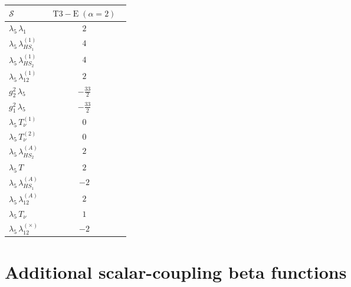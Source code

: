 \documentclass[9pt]{article}
\begin{document}
\begin{longtable}{@{}p{0.31\linewidth}c@{}}
\toprule
$\mathcal{S}$ & $ \mathrm{T3-E}\;(\alpha=2) $ \\
\midrule
$ \lambda_5\,\lambda_1 $ & $ 2 $ \\
$ \lambda_5\,\lambda_{HS_1}^{(1)} $ & $ 4 $ \\
$ \lambda_5\,\lambda_{HS_2}^{(1)} $ & $ 4 $ \\
$ \lambda_5\,\lambda_{12}^{(1)} $ & $ 2 $ \\
$ g_2^2\,\lambda_5 $ & $ - \frac{33}{2} $ \\
$ g_1^2\,\lambda_5 $ & $ - \frac{33}{2} $ \\
$ \lambda_5\,T_{\nu}^{(1)} $ & $0$ \\
$ \lambda_5\,T_{\nu}^{(2)} $ & $0$ \\
$ \lambda_5\,\lambda_{HS_2}^{(A)} $ & $ 2 $ \\
$ \lambda_5\,T $ & $ 2 $ \\
$ \lambda_5\,\lambda_{HS_1}^{(A)} $ & $ -2 $ \\
$ \lambda_5\,\lambda_{12}^{(A)} $ & $ 2 $ \\
$ \lambda_5\,T_\nu $ & $ 1 $ \\
$ \lambda_5\,\lambda_{12}^{(\times)} $ & $ -2 $ \\
\bottomrule
\end{longtable}
\section*{Additional scalar-coupling beta functions}
\end{document}
